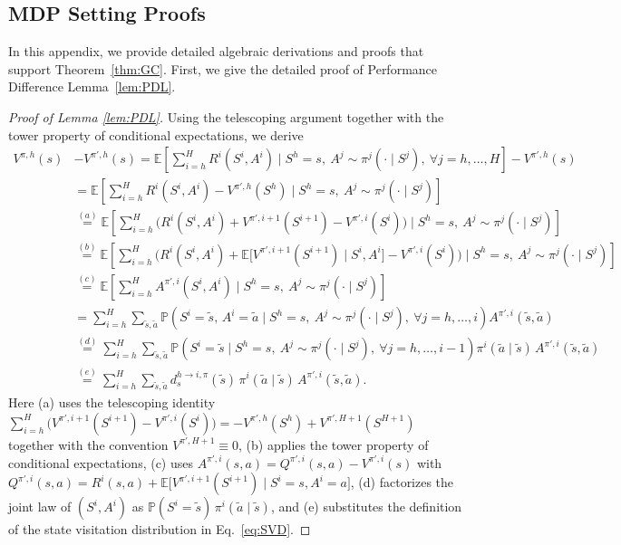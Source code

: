 \documentclass[11pt]{article}
\newcommand{\E}{\mathbb{E}}
\begin{document}
\subsection{MDP Setting Proofs} \label{app:Tabularlem}
In this appendix, we provide detailed algebraic derivations and proofs that support Theorem~\ref{thm:GC}. First, we give the detailed proof of Performance Difference Lemma~\ref{lem:PDL}. 

\begin{proof}[Proof of Lemma \ref{lem:PDL}]
Using the telescoping argument together with the tower property of conditional expectations, we derive
\begin{align*}
V^{\pi,h}(s) & - V^{\pi',h}(s)
=
\E\!\left[\sum_{i=h}^{H} R^i(S^i,A^i)\mid
S^h=s,\ A^j\sim \pi^j(\cdot\mid S^j),\ \forall j=h,\ldots,H
\right]
- V^{\pi',h}(s) \\
&=
\E\!\left[\sum_{i=h}^{H} R^i(S^i,A^i) - V^{\pi',h}(S^h)\mid
S^h=s,\ A^j\sim \pi^j(\cdot\mid S^j)
\right] \\
&\overset{(a)}{=}
\E\!\left[\sum_{i=h}^{H}
\Big(
R^i(S^i,A^i) + V^{\pi',i+1}(S^{i+1}) - V^{\pi',i}(S^i)
\Big)
\mid
S^h=s,\ A^j\sim \pi^j(\cdot\mid S^j)
\right] \\
&\overset{(b)}{=}
\E\!\left[\sum_{i=h}^{H}
\Big(
R^i(S^i,A^i) + \E\big[V^{\pi',i+1}(S^{i+1})\mid S^i,A^i\big] - V^{\pi',i}(S^i)
\Big)
\mid
S^h=s,\ A^j\sim \pi^j(\cdot\mid S^j)
\right] \\
&\overset{(c)}{=}
\E\!\left[\sum_{i=h}^{H} A^{\pi',i}(S^i,A^i)\mid
S^h=s,\ A^j\sim \pi^j(\cdot\mid S^j)
\right] \\
&=
\sum_{i=h}^{H}\sum_{\tilde s,\tilde a}
\mathbb{P}\left(S^i=\tilde s,\, A^i=\tilde a \mid
S^h=s,\ A^j\sim \pi^j(\cdot\mid S^j),\ \forall j=h,\ldots,i
\right)
A^{\pi',i}(\tilde s,\tilde a) \\
&\overset{(d)}{=}
\sum_{i=h}^{H}\sum_{\tilde s,\tilde a}
\mathbb{P}\left(S^i=\tilde s \mid
S^h=s,\ A^j\sim \pi^j(\cdot\mid S^j),\ \forall j=h,\ldots,i-1
\right)
\pi^i(\tilde a\mid \tilde s)\,
A^{\pi',i}(\tilde s,\tilde a) \\
&\overset{(e)}{=}
\sum_{i=h}^{H}\sum_{\tilde s,\tilde a}
d^{h\to i,\pi}_s(\tilde s)\,\pi^i(\tilde a\mid \tilde s)\,A^{\pi',i}(\tilde s,\tilde a).
\end{align*}
Here (a) uses the telescoping identity
$\sum_{i=h}^{H}\big(V^{\pi',i+1}(S^{i+1})-V^{\pi',i}(S^i)\big)
= -V^{\pi',h}(S^h)+V^{\pi',H+1}(S^{H+1})$
together with the convention $V^{\pi',H+1}\equiv 0$,
(b) applies the tower property of conditional expectations,
(c) uses
$A^{\pi',i}(s,a)=Q^{\pi',i}(s,a)-V^{\pi',i}(s)$ with
$Q^{\pi',i}(s,a)=R^i(s,a)+\E\big[V^{\pi',i+1}(S^{i+1})\mid S^i=s,A^i=a\big]$,
(d) factorizes the joint law of $(S^i,A^i)$ as
$\mathbb{P}(S^i=\tilde s)\,\pi^i(\tilde a\mid\tilde s)$, and
(e) substitutes the definition of the state visitation distribution in Eq.~\eqref{eq:SVD}.
\end{proof}
\end{document}
